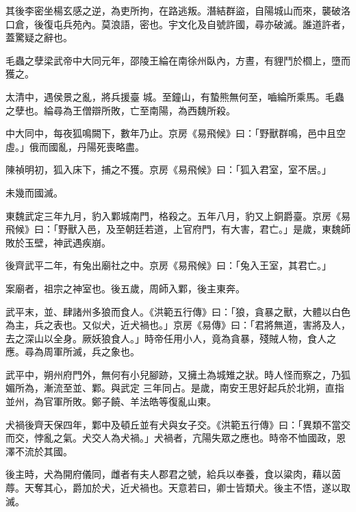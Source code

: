 \begin{pinyinscope}
 其後李密坐楊玄感之逆，為吏所拘，在路逃叛。潛結群盜，自陽城山而來，襲破洛口倉，後復屯兵苑內。莫浪語，密也。宇文化及自號許國，尋亦破滅。誰道許者，蓋驚疑之辭也。



 毛蟲之孽梁武帝中大同元年，邵陵王綸在南徐州臥內，方晝，有貍鬥於櫩上，墮而獲之。



 太清中，遇侯景之亂，將兵援臺
 城。至鐘山，有蟄熊無何至，嚙綸所乘馬。毛蟲之孽也。綸尋為王僧辯所敗，亡至南陽，為西魏所殺。



 中大同中，每夜狐鳴闕下，數年乃止。京房《易飛候》曰：「野獸群鳴，邑中且空虛。」俄而國亂，丹陽死喪略盡。



 陳禎明初，狐入床下，捕之不獲。京房《易飛候》曰：「狐入君室，室不居。」



 未幾而國滅。



 東魏武定三年九月，豹入鄴城南門，格殺之。五年八月，豹又上銅爵臺。京房《易飛候》曰：「野獸入邑，及至朝廷若道，上官府門，有大害，君亡。」是歲，東魏師敗於玉壁，神武遇疾崩。



 後齊武平二年，有兔出廟社之中。京房《易飛候》曰：「兔入王室，其君亡。」



 案廟者，祖宗之神室也。後五歲，周師入鄴，後主東奔。



 武平末，並、肆諸州多狼而食人。《洪範五行傳》曰：「狼，貪暴之獸，大體以白色為主，兵之表也。又似犬，近犬禍也。」京房《易傳》曰：「君將無道，害將及人，去之深山以全身。厥妖狼食人。」時帝任用小人，竟為貪暴，殘賊人物，食人之應。尋為周軍所滅，兵之象也。



 武平中，朔州府門外，無何有小兒腳跡，又擁土為城雉之狀。時人怪而察之，乃狐媚所為，漸流至並、鄴。與武定
 三年同占。是歲，南安王思好起兵於北朔，直指並州，為官軍所敗。鄭子饒、羊法皓等復亂山東。



 犬禍後齊天保四年，鄴中及頓丘並有犬與女子交。《洪範五行傳》曰：「異類不當交而交，悖亂之氣。犬交人為犬禍。」犬禍者，亢陽失眾之應也。時帝不恤國政，恩澤不流於其國。



 後主時，犬為開府儀同，雌者有夫人郡君之號，給兵以奉養，食以粱肉，藉以茵蓐。天奪其心，爵加於犬，近犬禍也。天意若曰，卿士皆類犬。後主不悟，遂以取滅。




\end{pinyinscope}
